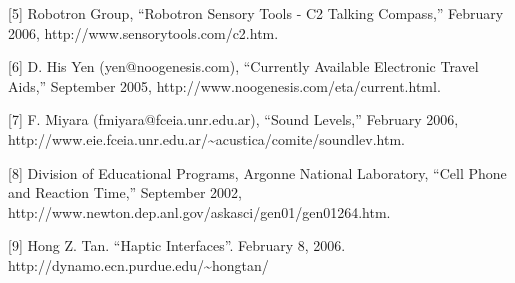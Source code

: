 {[}5{]} Robotron Group, ``Robotron Sensory Tools - C2 Talking Compass,''
February 2006, http://www.sensorytools.com/c2.htm.

{[}6{]} D. His Yen (yen@noogenesis.com), ``Currently Available
Electronic Travel Aids,'' September 2005,
http://www.noogenesis.com/eta/current.html.

{[}7{]} F. Miyara (fmiyara@fceia.unr.edu.ar), ``Sound Levels,'' February
2006,
http://www.eie.fceia.unr.edu.ar/\textasciitilde acustica/comite/soundlev.htm.

{[}8{]} Division of Educational Programs, Argonne National Laboratory,
``Cell Phone and Reaction Time,'' September 2002,
http://www.newton.dep.anl.gov/askasci/gen01/gen01264.htm.

{[}9{]} Hong Z. Tan. ``Haptic Interfaces''. February 8, 2006.
http://dynamo.ecn.purdue.edu/\textasciitilde hongtan/
